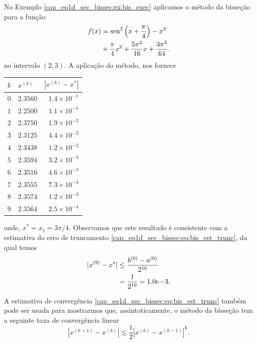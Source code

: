 \begin{ex}\label{cap_eq1d_sec_bissec:ex:bis_convp}
  No Exemplo \ref{cap_eq1d_sec_bissec:ex:bis_exec} aplicamos o método da bisseção para a função
  \begin{equation}
    \begin{aligned}
      f(x) &= \operatorname{sen}^2\left(x+\frac{\pi}{4}\right) - x^3 \\
           &+ \frac{\pi}{4}x^2 + \frac{5\pi^2}{16}x + \frac{3\pi^3}{64}.
    \end{aligned}
\end{equation}
no intervalo $(2, 3)$. A aplicação do método, nos fornece
\begin{center}
  \begin{tabular}[H]{llr}
    $k$ & $x^{(k)}$ & $\left|x^{(k)}-x^{*}\right|$\\\hline
    $0$ & $2.3560$ & $1.4\times 10^{-1}$ \\
    $1$ & $2.2500$ & $1.1\times 10^{-1}$ \\
    $2$ & $2.3750$ & $1.9\times 10^{-2}$ \\
    $3$ & $2.3125$ & $4.4\times 10^{-2}$ \\
    $4$ & $2.3438$ & $1.2\times 10^{-2}$ \\
    $5$ & $2.3594$ & $3.2\times 10^{-3}$ \\
    $6$ & $2.3516$ & $4.6\times 10^{-3}$ \\
    $7$ & $2.3555$ & $7.3\times 10^{-4}$ \\
    $8$ & $2.3574$ & $1.2\times 10^{-3}$ \\
    $9$ & $2.3564$ & $2.5\times 10^{-4}$ \\\hline
  \end{tabular}
\end{center}
onde, $x^* = x_1 = 3\pi/4$. Observamos que este resultado é consistente com a estimativa do erro de truncamento \eqref{cap_eq1d_sec_bissec:eq:bis_est_trunc}, da qual temos
\begin{align}
  |x^{(9)} - x^*| &\leq \frac{b^{(0)}-a^{(0)}}{2^{10}}\\
                  &= \frac{1}{2^{10}} = 1.0\mathrm{e}\!-\!3.
\end{align}
\end{ex}

\begin{obs}
  A estimativa de convergência \eqref{cap_eq1d_sec_bissec:eq:bis_est_trunc} também pode ser usada para mostrarmos que, assintoticamente, o método da bisseção tem a seguinte taxa de convergência linear
  \begin{equation}
    \left|x^{(k+1)} - x^{(k)}\right| \lesssim \frac{1}{2}\left|x^{(k)} - x^{(k-1)}\right|^{\pmb{1}}.
  \end{equation}
\end{obs}

